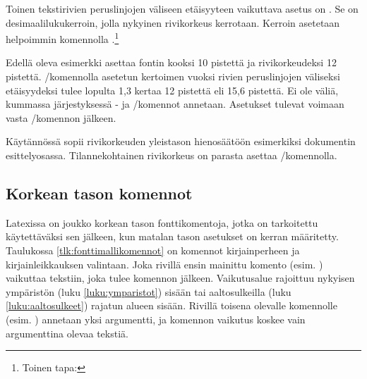 Toinen tekstirivien peruslinjojen väliseen etäisyyteen vaikuttava asetus
on . Se on desimaalilukukerroin, jolla
nykyinen rivikorkeus kerrotaan. Kerroin asetetaan helpoimmin komennolla
.\footnote{Toinen tapa: }

\begin{koodilohkosis}
  \fontsize{10bp}{12bp} \linespread{1.3} \selectfont
\end{koodilohkosis}

Edellä oleva esimerkki asettaa fontin kooksi 10 pistettä ja
rivikorkeudeksi 12 pistettä. \-/komennolla
asetetun kertoimen vuoksi rivien peruslinjojen väliseksi etäisyydeksi
tulee lopulta 1,3 kertaa 12 pistettä eli 15,6 pistettä. Ei ole väliä,
kummassa järjestyksessä - ja \-/komennot annetaan. Asetukset tulevat voimaan vasta
\-/komennon jälkeen.

Käytännössä  sopii rivikorkeuden yleistason
hienosäätöön esimerkiksi dokumentin esittelyosassa. Tilannekohtainen
rivikorkeus on parasta asettaa \-/komennolla.

\subsection{Korkean tason komennot}
\label{luku:fontit_korkea}

Latexissa on joukko korkean tason fonttikomentoja, jotka on tarkoitettu
käytettäväksi sen jälkeen, kun matalan tason asetukset on kerran
määritetty. Taulukossa \ref{tlk:fonttimallikomennot} on komennot
kirjainperheen ja kirjainleikkauksen valintaan. Joka rivillä ensin
mainittu komento (esim. ) vaikuttaa
tekstiin, joka tulee komennon jälkeen. Vaikutus\-alue rajoittuu nykyisen
ympäristön (luku \ref{luku:ymparistot}) sisään tai aaltosulkeilla (luku
\ref{luku:aaltosulkeet}) rajatun alueen sisään. Rivillä toisena olevalle
komennolle (esim. ) annetaan yksi
argumentti, ja komennon vaikutus koskee vain argumenttina olevaa
tekstiä.

\providecommand{\rivi}{}
\renewcommand{\rivi}[4]{%
  \koodi{\keno #1} & \koodi{\keno #2\{\ldots\}} & #3 & #4 \\}

